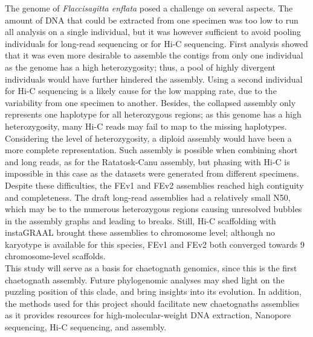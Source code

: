 The genome of \textit{Flaccisagitta enflata} posed a challenge on several aspects. The amount of DNA that could be extracted from one specimen was too low to run all analysis on a single individual, but it was however sufficient to avoid pooling individuals for long-read sequencing or for Hi-C sequencing. First analysis showed that it was even more desirable to assemble the contigs from only one individual as the genome has a high heterozygosity; thus, a pool of highly divergent individuals would have further hindered the assembly. Using a second individual for Hi-C sequencing is a likely cause for the low mapping rate, due to the variability from one specimen to another. Besides, the collapsed assembly only represents one haplotype for all heterozygous regions; as this genome has a high heterozygosity, many Hi-C reads may fail to map to the missing haplotypes. Considering the level of heterozygosity, a diploid assembly would have been a more complete representation. Such assembly is possible when combining short and long reads, as for the Ratatosk-Canu assembly, but phasing with Hi-C is impossible in this case as the datasets were generated from different specimens. \\
Despite these difficulties, the FEv1 and FEv2 assemblies reached high contiguity and completeness. The draft long-read assemblies had a relatively small N50, which may be to the numerous heterozygous regions causing unresolved bubbles in the assembly graphs and leading to breaks. Still, Hi-C scaffolding with instaGRAAL brought these assemblies to chromosome level; although no karyotype is available for this species, FEv1 and FEv2 both converged towards 9 chromosome-level scaffolds. \\
This study will serve as a basis for chaetognath genomics, since this is the first chaetognath assembly. Future phylogenomic analyses may shed light on the puzzling position of this clade, and bring insights into its evolution. In addition, the methods used for this project should facilitate new chaetognaths assemblies as it provides resources for high-molecular-weight DNA extraction, Nanopore sequencing, Hi-C sequencing, and assembly.